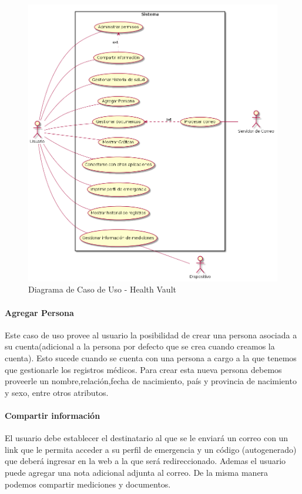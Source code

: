 \begin{figure} 
  \centering
\includegraphics[width=1\textwidth]{img/tp1/cu-hv}
  \caption{Diagrama de Caso de Uso - Health Vault}
  \label{casoDeUsoHV}
\end{figure}
 	
\paragraph{Agregar Persona}

Este caso de uso provee al usuario la posibilidad de crear una persona asociada a su cuenta(adicional a la persona por defecto que se crea cuando creamos la cuenta). Esto sucede cuando se cuenta con una persona a cargo a la que tenemos que gestionarle los registros médicos. Para crear esta nueva persona debemos proveerle un nombre,relación,fecha de nacimiento, país y provincia de nacimiento y sexo, entre otros atributos.
 
\paragraph{Compartir información}
 
El usuario debe establecer el destinatario al que se le enviará un correo con un link que le permita acceder a su perfil de emergencia y un código (autogenerado) que deberá ingresar en la web a la que será redireccionado. Ademas el usuario puede agregar una nota adicional adjunta al correo. De la misma manera podemos compartir mediciones y documentos.

